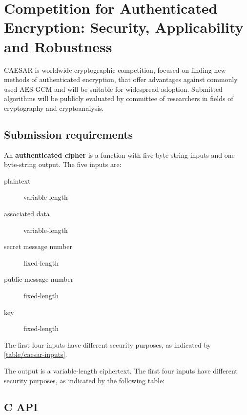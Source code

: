 \chapter{Competition for Authenticated Encryption: Security, Applicability and Robustness}

CAESAR is worldwide cryptographic competition, focused on finding new methods of authenticated encryption, that offer advantages against commonly used AES-GCM and will be suitable for widespread adoption. Submitted algorithms will be publicly evaluated by committee of researchers in fields of cryptography and cryptoanalysis.



\section{Submission requirements}

An \textbf{authenticated cipher} is a function with five byte-string inputs and one byte-string output. The five inputs are:

\begin{description}
  \item[plaintext] variable-length
  \item[associated data] variable-length
  \item[secret message number] fixed-length
  \item[public message number] fixed-length
  \item[key] fixed-length
\end{description}

The first four inputs have different security purposes, as indicated by \autoref{table/caesar-inputs}.




The output is a variable-length ciphertext. The first four inputs have different security purposes, as indicated by the following table:

\section{C API}


